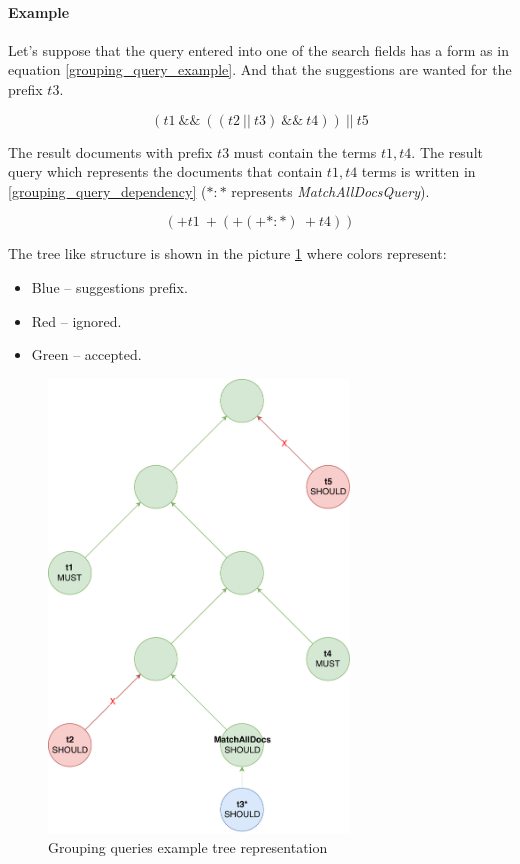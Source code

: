 \paragraph{Example}
Let's suppose that the query entered into one of the search fields has a form as in equation \ref{grouping_query_example}.
And that the suggestions are wanted for the prefix $t3$.

\begin{equation}
\label{grouping_query_example}
(t1\ \&\&\ ((t2\ \vert\vert\ t3)\ \&\&\ t4))\ \vert\vert\ t5
\end{equation}

The result documents with prefix $t3$ must contain the terms $t1, t4$. The result query which represents the documents that
contain $t1, t4$ terms
is written in \ref{grouping_query_dependency} (${*}\colon{*}$ represents \textit{MatchAllDocsQuery}).

\begin{equation}
\label{grouping_query_dependency}
({+}t1\ {+}({+}({+}{*}\colon{*})\ {+}t4))
\end{equation}

The tree like structure is shown in the picture \ref{group_tree} where colors represent:
\begin{itemize}
    \item Blue – suggestions prefix.
    \item Red – ignored.
    \item Green – accepted.
\end{itemize}

\begin{figure}[htbp]
    \centering
    \includegraphics[width=80mm]{../img/complex_query.pdf}
    \caption{Grouping queries example tree representation}
    \label{group_tree}
\end{figure}

